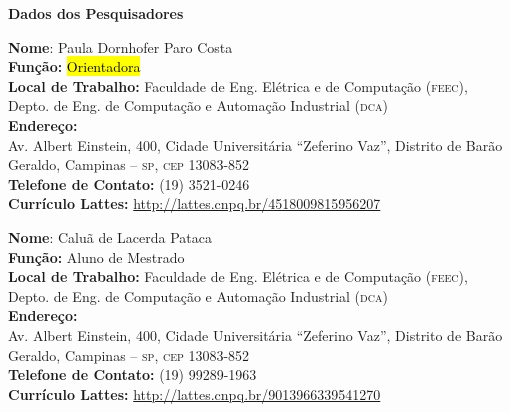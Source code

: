 \documentclass[a4paper,11pt,titlepage,singlespacing]{article}
\begin{document}
\begin{titlepage}
\noindent \Large{\textbf{Dados dos Pesquisadores}}\\

\vspace{10pt}
\begin{flushleft}
\large{\textbf{Nome}: Paula Dornhofer Paro Costa}\\
\large{\textbf{Função:} \hl{Orientadora}}\\
\large{\textbf{Local de Trabalho:} Faculdade de Eng. Elétrica e de Computação (\textsc{feec}), \\ Depto. de Eng. de Computação e Automação Industrial (\textsc{dca})}\\
\large{\textbf{Endereço:} \\Av. Albert Einstein, 400, Cidade Universitária ``Zeferino Vaz'', Distrito de Barão Geraldo, Campinas – \textsc{sp}, \textsc{cep} 13083-852}\\
\large{\textbf{Telefone de Contato:} (19) 3521-0246 }\\
\large{\textbf{Currículo Lattes:} \url{http://lattes.cnpq.br/4518009815956207} }\\
\end{flushleft}

\vspace{10pt}

\begin{flushleft}
\large{\textbf{Nome}: Caluã de Lacerda Pataca }\\
\large{\textbf{Função:} Aluno de Mestrado}\\
\large{\textbf{Local de Trabalho:} Faculdade de Eng. Elétrica e de Computação (\textsc{feec}), \\ Depto. de Eng. de Computação e Automação Industrial (\textsc{dca})}\\
\large{\textbf{Endereço:} \\Av. Albert Einstein, 400, Cidade Universitária ``Zeferino Vaz'', Distrito de Barão Geraldo, Campinas – \textsc{sp}, \textsc{cep} 13083-852}\\
\large{\textbf{Telefone de Contato:} (19) 99289-1963 }\\
\large{\textbf{Currículo Lattes:} \url{http://lattes.cnpq.br/9013966339541270} }\\
\end{flushleft}
\vspace{10pt}

\vspace{10pt}

\end{titlepage}
\end{document}
